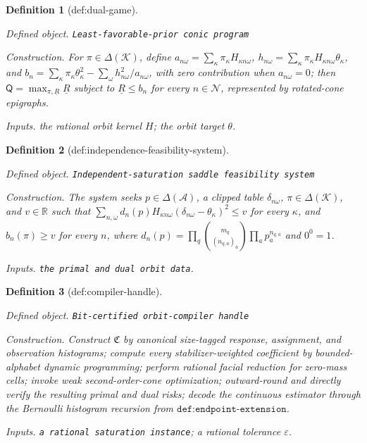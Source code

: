\documentclass{article}
\newtheorem{definition}{Definition}
\begin{document}
\begin{definition}[def:dual-game]\label{def:dual-game}
\par\smallskip\noindent\emph{Defined object.} \texttt{Least-\allowbreak{}favorable-\allowbreak{}prior conic program}
\par\smallskip\noindent\emph{Construction.} For \(\pi\in\Delta(\mathcal K)\), define \(a_{n\omega}=\sum_\kappa\pi_\kappa H_{\kappa n\omega}\), \(h_{n\omega}=\sum_\kappa\pi_\kappa H_{\kappa n\omega}\theta_\kappa\), and \(b_n=\sum_\kappa\pi_\kappa\theta_\kappa^2-\sum_\omega h_{n\omega}^2/a_{n\omega}\), with zero contribution when \(a_{n\omega}=0\); then \(\mathsf Q=\max_{\pi,\underline R}\underline R\) subject to \(\underline R\le b_n\) for every \(n\in\mathcal N\), represented by rotated-cone epigraphs.
\par\smallskip\noindent\emph{Inputs.} the rational orbit kernel \(H\); the orbit target \(\theta\).
\end{definition}

\begin{definition}[def:independence-feasibility-system]\label{def:independence-feasibility-system}
\par\smallskip\noindent\emph{Defined object.} \texttt{Independent-\allowbreak{}saturation saddle feasibility system}
\par\smallskip\noindent\emph{Construction.} The system seeks \(p\in\Delta(\mathcal A)\), a clipped table \(\delta_{n\omega}\), \(\pi\in\Delta(\mathcal K)\), and \(v\in\mathbb R\) such that \(\sum_{n,\omega}d_n(p)H_{\kappa n\omega}(\delta_{n\omega}-\theta_\kappa)^2\le v\) for every \(\kappa\), and \(b_n(\pi)\ge v\) for every \(n\), where \(d_n(p)=\prod_q\binom{m_q}{(n_{q,a})_a}\prod_ap_a^{n_{q,a}}\) and \(0^0=1\).
\par\smallskip\noindent\emph{Inputs.} \texttt{the primal and dual orbit data}.
\end{definition}

\begin{definition}[def:compiler-handle]\label{def:compiler-handle}
\par\smallskip\noindent\emph{Defined object.} \texttt{Bit-\allowbreak{}certified orbit-\allowbreak{}compiler handle}
\par\smallskip\noindent\emph{Construction.} Construct \(\mathfrak C\) by canonical size-tagged response, assignment, and observation histograms; compute every stabilizer-weighted coefficient by bounded-alphabet dynamic programming; perform rational facial reduction for zero-mass cells; invoke weak second-order-cone optimization; outward-round and directly verify the resulting primal and dual risks; decode the continuous estimator through the Bernoulli histogram recursion from \(\texttt{def:endpoint-extension}\).
\par\smallskip\noindent\emph{Inputs.} \texttt{a rational saturation instance}; a rational tolerance \(\varepsilon\).
\end{definition}
\end{document}
